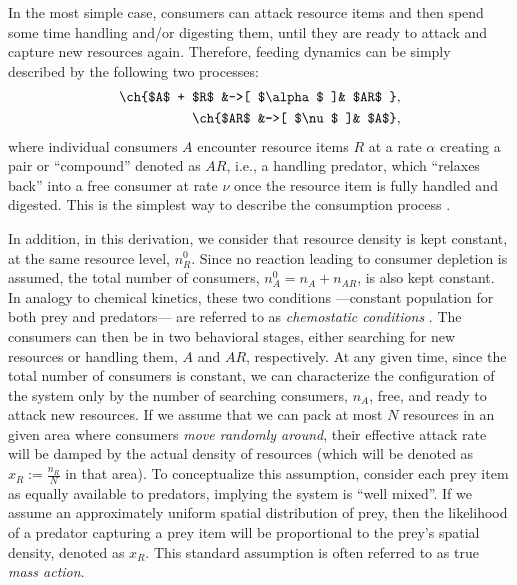 In the most simple case, consumers can attack resource items and then spend some time handling and/or digesting them, until they are ready to attack and capture new resources again. Therefore, feeding dynamics can be simply described by the following two processes:
\begin{eqnarray}
\ch{$A$ + $R$ &->[ $\alpha$ ]& $AR$ }, \label{int_AR_HII}
\label{int_AR_HII_Tau}\\
\ch{$AR$  &->[ $\nu$  ]& $A$},  
\label{death_AR_HII}
\end{eqnarray}
where individual consumers $A$ encounter resource items $R$ at a rate $\alpha$ creating a pair or ``compound'' denoted as $AR$, i.e., a handling predator, which ``relaxes back'' into a free consumer at rate $\nu$ once the resource item is fully handled and digested. This is the simplest way to describe the consumption process \citep{real1977}. 
\smallskip

In addition, in this derivation, we consider that resource density is kept constant, at the same resource level, $n_R^0$. Since no reaction leading to consumer depletion is assumed, the total number of consumers, $n_A^0 = n_A + n_{AR}$, is also kept constant. In analogy to chemical kinetics, these two conditions ---constant population for both prey and predators--- are referred to as \emph{chemostatic conditions} \citep{vankampen2011}. The consumers can then be in two behavioral stages, either searching for new resources or handling them, $A$ and $AR$, respectively. At any given time, since the total number of consumers is constant, we can characterize the configuration of the system only by the number of searching consumers, $n_A$, free, and ready to attack new resources. If we assume that we can pack at most $N$ resources in an given area where consumers \emph{move randomly around}, their effective attack rate will be damped by the actual density of resources (which will be denoted as $x_R:=\frac{n_R}{N}$ in that area). To conceptualize this assumption, consider each prey item as equally available to predators, implying the system is ``well mixed''. If we assume an approximately uniform spatial distribution of prey, then the likelihood of a predator capturing a prey item will be proportional to the prey's spatial density, denoted as $x_R$. This standard assumption is often referred to as true \emph{mass action}\citep{mccallum2001should,vankampen2011}.
\smallskip


